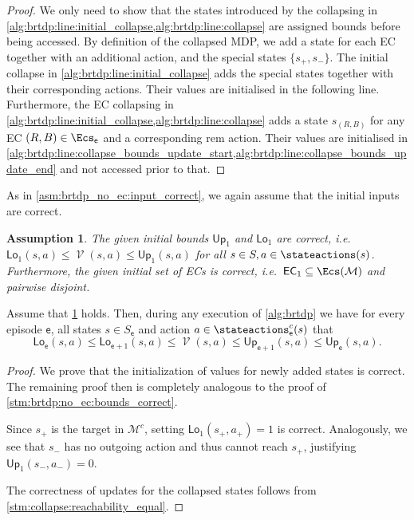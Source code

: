 \documentclass{article}
\newcommand{\MDP}{\mathcal{M}}
\newcommand{\States}{S}
\DeclareMathOperator{\val}{\mathcal{V}}
\newcommand{\upperbound}{\mathsf{Up}}
\newcommand{\lowerbound}{\mathsf{Lo}}
\newcommand{\targetstate}{s_+}
\newcommand{\sinkstate}{s_-}
\newcommand{\ecremain}{\mathrm{rem}}
\newcommand{\algoepisode}{\mathsf{e}}
\newcommand{\algoecs}{\mathsf{EC}}
\newtheorem{assumption}{Assumption}
\begin{document}
\begin{proof}
	We only need to show that the states introduced by the collapsing in \cref{alg:brtdp:line:initial_collapse,alg:brtdp:line:collapse} are assigned bounds before being accessed.
	By definition of the collapsed MDP, we add a state for each EC together with an additional action, and the special states $\{\targetstate, \sinkstate\}$.
	The initial collapse in \cref{alg:brtdp:line:initial_collapse} adds the special states together with their corresponding actions.
	Their values are initialised in the following line.
	Furthermore, the EC collapsing in \cref{alg:brtdp:line:initial_collapse,alg:brtdp:line:collapse} adds a state $s_{(R,B)}$ for any EC $(R,B) \in \Ecs_\algoepisode$ and a corresponding $\ecremain$ action.
	Their values are initialised in \cref{alg:brtdp:line:collapse_bounds_update_start,alg:brtdp:line:collapse_bounds_update_end} and not accessed prior to that. 
\end{proof}
As in \cref{asm:brtdp_no_ec:input_correct}, we again assume that the initial inputs are correct.
\begin{assumption} \label{asm:brtdp_input_correct}
	The given initial bounds $\upperbound_1$ and $\lowerbound_1$ are correct, i.e.\ $\lowerbound_1(s, a) \leq \val(s, a) \leq \upperbound_1(s, a)$ for all $s \in \States, a \in \stateactions(s)$.
	Furthermore, the given initial set of ECs is correct, i.e.\ $\algoecs_1 \subseteq \Ecs(\MDP)$ and pairwise disjoint.
\end{assumption}
\begin{lemma} \label{stm:brtdp:bounds_correct}
	Assume that \cref{asm:brtdp_input_correct} holds.
	Then, during any execution of \cref{alg:brtdp} we have for every episode $\algoepisode$, all states $s \in \States_\algoepisode$ and action $a \in \stateactions^c_\algoepisode(s)$ that
	\begin{equation*}
		\lowerbound_\algoepisode(s, a) \leq \lowerbound_{\algoepisode + 1}(s, a) \leq \val(s, a) \leq \upperbound_{\algoepisode + 1}(s, a) \leq \upperbound_\algoepisode(s, a).
	\end{equation*}
\end{lemma}

\begin{proof}
	We prove that the initialization of values for newly added states is correct.
	The remaining proof then is completely analogous to the proof of \cref{stm:brtdp:no_ec:bounds_correct}.

	Since $\targetstate$ is the target in $\MDP^c$, setting $\lowerbound_1(\targetstate, a_+) = 1$ is correct.
	Analogously, we see that $\sinkstate$ has no outgoing action and thus cannot reach $\targetstate$, justifying $\upperbound_1(\sinkstate, a_-) = 0$.

	The correctness of updates for the collapsed states follows from \cref{stm:collapse:reachability_equal}. 
\end{proof}
\end{document}
